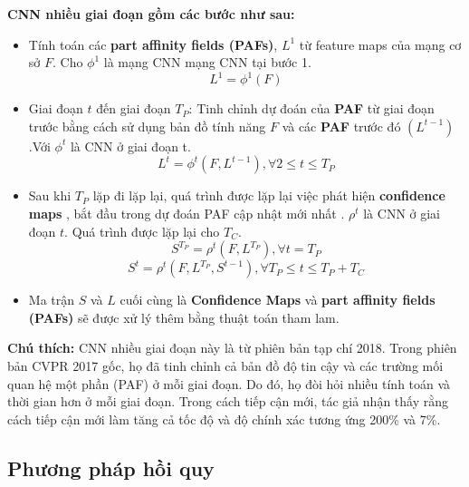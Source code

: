 \begin{itemize}
\textbf{CNN nhiều giai đoạn gồm các bước như sau:}
\begin{itemize}
\item Tính toán các \textbf{part affinity fields (PAFs)}, $ L^{1}$ từ feature maps của mạng cơ sở $F$. Cho $\phi^1$ là mạng CNN mạng CNN tại bước 1. 
$$L^1 = \phi^1(F) $$

\item Giai đoạn $t$ đến giai đoạn $T_P$: Tinh chỉnh dự đoán của \textbf{PAF} từ giai đoạn trước bằng cách sử dụng bản đồ tính năng $F$ và các \textbf{PAF} trước đó $(L^{t-1})$.Với $\phi^t$ là CNN ở giai đoạn t.
$$L^t = \phi^t(F, L^{t-1}), \forall 2 \leq t \leq T_P$$
\item Sau khi $T_P$ lặp đi lặp lại, quá trình được lặp lại việc phát hiện \textbf{confidence maps} , bắt đầu trong dự đoán PAF cập nhật mới nhất . $\rho^t$ là CNN ở giai đoạn $t$. Quá trình được lặp lại cho $T_C$.
$$S^{T_P} = \rho^t(F, L^{T_P}), \forall t = T_P$$
$$S^t = \rho^t(F, L^{T_P}, S^{t-1}), \forall T_P \leq t \leq T_P + T_C$$

\item Ma trận $S$ và $L$ cuối cùng là \textbf{Confidence Maps} và \textbf{part affinity fields (PAFs)} sẽ được xử lý thêm bằng thuật toán tham lam.

\end{itemize}
\end{itemize}
\textbf{Chú thích:}
CNN nhiều giai đoạn này là từ phiên bản tạp chí 2018. Trong phiên bản CVPR 2017 gốc, họ đã tinh chỉnh cả bản đồ độ tin cậy và các trường mối quan hệ một phần (PAF) ở mỗi giai đoạn. Do đó, họ đòi hỏi nhiều tính toán và thời gian hơn ở mỗi giai đoạn. Trong cách tiếp cận mới, tác giả nhận thấy rằng cách tiếp cận mới làm tăng cả tốc độ và độ chính xác tương ứng 200\% và 7\%.

\subsection{Phương pháp hồi quy}
\label{sss:MHD3_ly_thuyet_do_phuc_tap}

